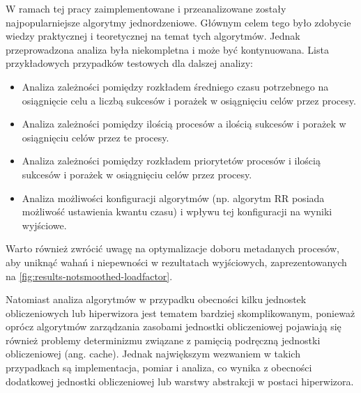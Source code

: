 \documentclass[../main]{subfiles}
\begin{document}
W ramach tej pracy zaimplementowane i przeanalizowane zostały najpopularniejsze algorytmy jednordzeniowe. Głównym celem tego było zdobycie wiedzy praktycznej i teoretycznej na temat tych algorytmów. Jednak przeprowadzona analiza była niekompletna i może być kontynuowana. Lista przykładowych przypadków testowych dla dalszej analizy:

\begin{itemize}
    \item Analiza zależności pomiędzy rozkładem średniego czasu potrzebnego na osiągnięcie celu a liczbą sukcesów i porażek w osiągnięciu celów przez procesy.
    \item Analiza zależności pomiędzy ilością procesów a ilością sukcesów i porażek w osiągnięciu celów przez te procesy.
    \item Analiza zależności pomiędzy rozkładem priorytetów procesów i ilością sukcesów i porażek w osiągnięciu celów przez procesy.
    \item Analiza możliwości konfiguracji algorytmów (np. algorytm RR posiada możliwość ustawienia kwantu czasu) i wpływu tej konfiguracji na wyniki wyjściowe.
\end{itemize}

Warto również zwrócić uwagę na optymalizacje doboru metadanych procesów, aby uniknąć wahań i niepewności w rezultatach wyjściowych, zaprezentowanych na \cref{fig:results-notsmoothed-loadfactor}.

Natomiast analiza algorytmów w przypadku obecności kilku jednostek obliczeniowych lub hiperwizora jest tematem bardziej skomplikowanym, ponieważ oprócz algorytmów zarządzania zasobami jednostki obliczeniowej pojawiają się również problemy determinizmu związane z pamięcią podręczną jednostki obliczeniowej (ang. cache). Jednak największym wezwaniem w takich przypadkach są implementacja, pomiar i analiza, co wynika z obecności dodatkowej jednostki obliczeniowej lub warstwy abstrakcji w postaci hiperwizora.
\end{document}
